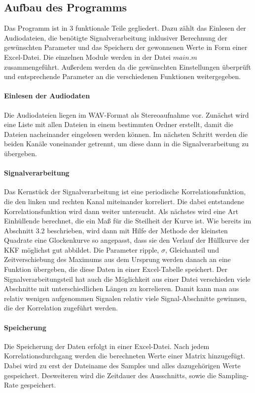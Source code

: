 \subsection{Aufbau des Programms}
Das Programm ist in 3 funktionale Teile gegliedert. Dazu zählt das Einlesen der Audiodateien, die benötigte Signalverarbeitung inklusiver Berechnung der gewünschten Parameter und das Speichern der gewonnenen Werte in Form einer Excel-Datei. Die einzelnen Module werden in der Datei $main.m$ zusammengeführt. Außerdem werden da die gewünschten Einstellungen überprüft und entsprechende Parameter an die verschiedenen Funktionen weitergegeben.
\paragraph{Einlesen der Audiodaten}
Die Audiodateien liegen im WAV-Format als Stereoaufnahme vor. Zunächst wird eine Liste mit allen Dateien in einem bestimmten Ordner erstellt, damit die Dateien nacheinander eingelesen werden können. Im nächsten Schritt werden die beiden Kanäle voneinander getrennt, um diese dann in die Signalverarbeitung zu übergeben.
\paragraph{Signalverarbeitung}
Das Kernstück der Signalverarbeitung ist eine periodische Korrelationsfunktion, die den linken und rechten Kanal miteinander korreliert. Die dabei entstandene Korrelationsfunktion wird dann weiter untersucht. Als nächstes wird eine Art Einhüllende berechnet, die ein Maß für die Steilheit der Kurve ist. Wie bereits im Abschnitt 3.2 beschrieben, wird dann mit Hilfe der Methode der kleinsten Quadrate eine Glockenkurve so angepasst, dass sie den Verlauf der Hüllkurve der KKF möglichst gut abbildet. Die Parameter ripple, $\sigma$, Gleichanteil und Zeitverschiebung des Maximums aus dem Ursprung werden danach an eine Funktion übergeben, die diese Daten in einer Excel-Tabelle speichert.
Der Signalverarbeitungsteil hat auch die Möglichkeit aus einer Datei verschieden viele Abschnitte mit unterschiedlichen Längen zu korrelieren. Damit kann man aus relativ wenigen aufgenommen Signalen relativ viele Signal-Abschnitte gewinnen, die der Korrelation zugeführt werden.
\paragraph{Speicherung}
Die Speicherung der Daten erfolgt in einer Excel-Datei. Nach jedem Korrelationsdurchgang werden die berechneten Werte einer Matrix hinzugefügt. Dabei wird zu erst der Dateiname des Samples und alles dazugehörigen Werte gespeichert. Desweiteren wird die Zeitdauer des Ausschnitts, sowie die Sampling-Rate gespeichert.

